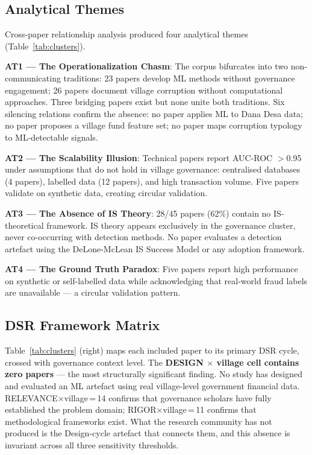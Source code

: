 \documentclass[3p,times,procedia]{elsarticle}
\begin{document}
\subsection{Analytical Themes}

Cross-paper relationship analysis produced four analytical themes (Table~\ref{tab:clusters}).

\textbf{AT1 --- The Operationalization Chasm}: The corpus bifurcates into two non-communicating traditions: 23 papers develop ML methods without governance engagement; 26 papers document village corruption without computational approaches. Three bridging papers exist but none unite both traditions. Six silencing relations confirm the absence: no paper applies ML to Dana Desa data; no paper proposes a village fund feature set; no paper maps corruption typology to ML-detectable signals.

\textbf{AT2 --- The Scalability Illusion}: Technical papers report AUC-ROC $>$0.95 under assumptions that do not hold in village governance: centralised databases (4 papers), labelled data (12 papers), and high transaction volume. Five papers validate on synthetic data, creating circular validation.

\textbf{AT3 --- The Absence of IS Theory}: 28/45 papers (62\%) contain no IS-theoretical framework. IS theory appears exclusively in the governance cluster, never co-occurring with detection methods. No paper evaluates a detection artefact using the DeLone-McLean IS Success Model \cite{method_delone2003} or any adoption framework.

\textbf{AT4 --- The Ground Truth Paradox}: Five papers report high performance on synthetic or self-labelled data while acknowledging that real-world fraud labels are unavailable --- a circular validation pattern.

\subsection{DSR Framework Matrix}

Table~\ref{tab:clusters} (right) maps each included paper to its primary DSR cycle, crossed with governance context level. The \textbf{DESIGN $\times$ village cell contains zero papers} --- the most structurally significant finding. No study has designed and evaluated an ML artefact using real village-level government financial data. RELEVANCE$\times$village\,=\,14 confirms that governance scholars have fully established the problem domain; RIGOR$\times$village\,=\,11 confirms that methodological frameworks exist. What the research community has not produced is the Design-cycle artefact that connects them, and this absence is invariant across all three sensitivity thresholds.
\end{document}

